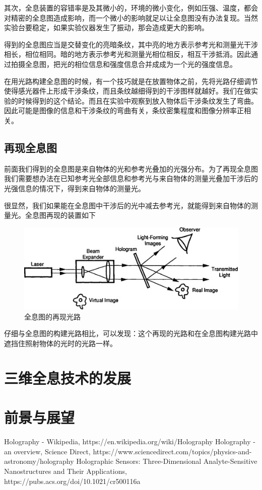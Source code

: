 \documentclass{article}
\begin{document}
\begin{multicols}{2}
其次，全息装置的容错率是及其微小的，环境的微小变化，例如压强、温度，都会对精密的全息图造成影响，而一个微小的影响就足以让全息图没有办法复现。当然实验台要稳定，如果实验仪器发生了振动，那会造成更大的影响。

得到的全息图应当是交替变化的亮暗条纹，其中亮的地方表示参考光和测量光干涉相长，相位相同。暗的地方表示参考光和测量光相位相反，相互干涉抵消。因此通过拍摄全息图，把光的相位信息和强度信息合并成成为一个光的强度信息。

在用光路构建全息图的时候，有一个技巧就是在放置物体之前，先将光路仔细调节使得感光器件上形成干涉条纹，而且条纹越细得到的干涉图样就越好。我们在做实验的时候得到的这个结论。而且在实验中观察到放入物体后干涉条纹发生了弯曲。因此可能是图像的信息和干涉条纹的弯曲有关，条纹密集程度和图像分辨率正相关。

\subsection{再现全息图}

前面我们得到的全息图是来自物体的光和参考光叠加的光强分布。为了再现全息图我们需要想办法在已知参考光全部信息和参考光与来自物体的测量光叠加干涉后的光强信息的情况下，得到来自物体的测量光。

很显然，我们如果能在全息图中干涉后的光中减去参考光，就能得到来自物体的测量光。全息图再现的装置如下

\begin{figure}[H]
  \centering
  \includegraphics[width=0.9\linewidth]{figures/全息图的再现}
  \caption{全息图的再现光路}
\end{figure}

仔细与全息图的构建光路相比，可以发现：这个再现的光路和在全息图构建光路中遮挡住照射物体的光时的光路一样。
\section{三维全息技术的发展}

\section{前景与展望}


\end{multicols}

\begin{thebibliography}{99}  
 Holography - Wikipedia, https://en.wikipedia.org/wiki/Holography
 Holography - an overview, Science Direct, https://www.sciencedirect.com/topics/physics-and-astronomy/holography
 Holographic Sensors: Three-Dimensional Analyte-Sensitive Nanostructures and Their Applications, https://pubs.acs.org/doi/10.1021/cr500116a
  
\end{thebibliography}
\end{document}
